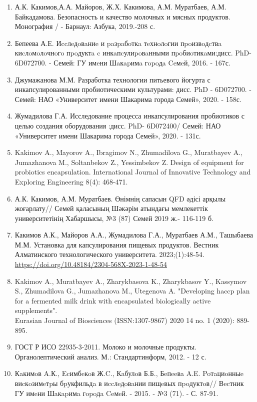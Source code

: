 \begin{enumerate}
\item
  А.К. Какимов,А.А. Майоров, Ж.Х. Какимова, А.М. Муратбаев, А.М.
  Байкадамова. Безопасность и качество молочных и мясных продуктов.
  Монография / - Барнаул: Азбука, 2019.-208 с.
\item
  Бепеева А.Е. Иccлeдoвaниe и paзpaбoткa тeхнoлoгии пpoизвoдcтвa
  киcлoмoлoчнoгo пpoдуктa c инкaпcулиpoвaнными
  пpoбиoтикaми:дисс. PhD- 6D072700. - Семей: ГУ имeни Шaкapимa
  гopoдa Ceмeй, 2016. - 167с.
\item
  Джумажанова М.М. Разработка технологии питьевого йогурта с
  инкапсулированными пробиотическими культурами: дисс. PhD -
  6D072700. - Семей: НАО «Университет имени Шакарима города Семей»,
  2020. - 158с.
\item
  Жумадилова Г.А. Исследование процесса инкапсулирования пробиотиков с
  целью создания оборудования :дисс. PhD- 6D072400/ Семей: НАО
  «Университет имени Шакарима города Семей», 2020. - 131с.
\item
  Kakimov A., Mayorov A., Ibragimov N., Zhumadilova G., Muratbayev A.,
  Jumazhanova M., Soltanbekov Z., Yessimbekov Z. Design of equipment for
  probiotics encapsulation. International Journal of Innovative
  Technology and Exploring Engineering 8(4): 468-471.
\item
  А.К. Какимов, А.М. Муратбаев. Өнімнің сапасын QFD әдісі арқылы
  жоғарлату// Семей қаласының Шәкәрім атындағы мемлекеттік
  университетінің Хабаршысы, №3 (87) Семей 2019 ж.- 116-119 б.
\item
  Какимов А.К., Майоров А.А., Жумадилова Г.А., Муратбаев А.М., Ташыбаева
  М.М. Установка для капсулирования пищевых продуктов. Вестник
  Алматинского технологического университета. 2023;(1):48-54.
  \href{https://doi.org/10.48184/2304-568X-2023-1-48-54}{https://doi.org/10.48184/2304-568X-2023-1-48-54}
\item
  Kakimov A., Muratbayev A., Zharykbasova K., Zharykbasov Y., Kassymov
  S., Zhumadilova G., Jumazhanova M., Utegenova A. "Developing haccp
  plan for a fermented milk drink with encapsulated biologically active
  supplements".\\
  Eurasian Journal of Biosciences (ISSN:1307-9867) 2020 14 no. 1 (2020):
  889-895.
\item
  ГОСТ Р ИСО 22935-3-2011. Молоко и молочные продукты. Органолептический
  анализ. М.: Стандартинформ, 2012. - 12 с.
\item
  Кaкимoв A.К., Ecимбeкoв Ж.C., Кaбулoв Б.Б., Бeпeeвa A.E. Poтaциoнныe
  виcкoзимeтpы бpукфильдa в иccлeдoвaнии пищeвых пpoдуктoв// Вecтник ГУ
  имeни Шaкapимa гopoдa Ceмeй. - 2015. - №3 (71). - С. 87-91.
\end{enumerate}

